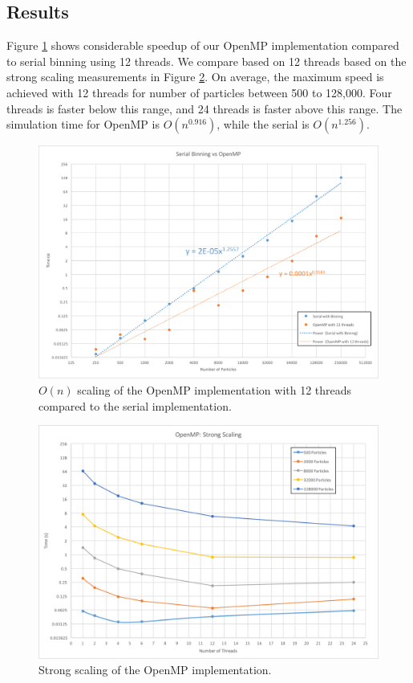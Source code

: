\documentclass[12pt]{article}
\begin{document}
\subsection{Results}

Figure \ref{fig:openmp-on} shows considerable speedup of our OpenMP implementation compared to serial binning using 12 threads. We compare based on 12 threads based on the strong scaling measurements in Figure \ref{fig:openmp-strong}. On average, the maximum speed is achieved with 12 threads for number of particles between 500 to 128,000. Four threads is faster below this range, and 24 threads is faster above this range. The simulation time for OpenMP is $O(n^{0.916})$, while the serial is $O(n^{1.256})$. 

\begin{figure}
	\centering
\includegraphics[width=\textwidth]{graphs/serial_binning_vs_openMP_12thr.png}
  \caption{$O(n)$ scaling of the OpenMP implementation with 12 threads compared to the serial implementation.}
  \label{fig:openmp-on}
\end{figure}

\begin{figure}
	\centering
\includegraphics[width=\textwidth]{graphs/openmp_strong_scaling.png}
  \caption{Strong scaling of the OpenMP implementation.}
  \label{fig:openmp-strong}
\end{figure}
\end{document}
